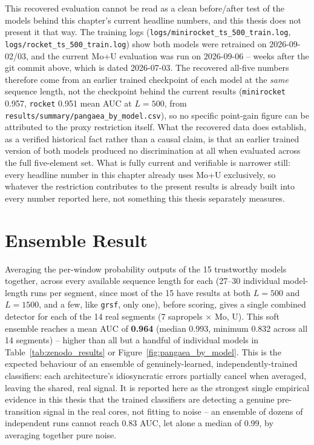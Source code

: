 This recovered evaluation cannot be read as a clean before/after test of the models behind this chapter's current headline numbers, and this thesis does not present it that way. The training logs (\texttt{logs/minirocket\_ts\_500\_train.log}, \texttt{logs/rocket\_ts\_500\_train.log}) show both models were retrained on 2026-09-02/03, and the current Mo+U evaluation was run on 2026-09-06 -- weeks after the git commit above, which is dated 2026-07-03. The recovered all-five numbers therefore come from an earlier trained checkpoint of each model at the \emph{same} sequence length, not the checkpoint behind the current results (\texttt{minirocket} 0.957, \texttt{rocket} 0.951 mean AUC at $L{=}500$, from \texttt{results/summary/pangaea\_by\_model.csv}), so no specific point-gain figure can be attributed to the proxy restriction itself. What the recovered data does establish, as a verified historical fact rather than a causal claim, is that an earlier trained version of both models produced no discrimination at all when evaluated across the full five-element set. What is fully current and verifiable is narrower still: every headline number in this chapter already uses Mo+U exclusively, so whatever the restriction contributes to the present results is already built into every number reported here, not something this thesis separately measures.

\section{Ensemble Result}
\label{sec:ensemble_result}
Averaging the per-window probability outputs of the 15 trustworthy models together, across every available sequence length for each (27--30 individual model-length runs per segment, since most of the 15 have results at both $L=500$ and $L=1500$, and a few, like \texttt{grsf}, only one), before scoring, gives a single combined detector for each of the 14 real segments (7 sapropels $\times$ Mo, U). This soft ensemble reaches a mean AUC of \textbf{0.964} (median 0.993, minimum 0.832 across all 14 segments) -- higher than all but a handful of individual models in Table~\ref{tab:zenodo_results} or Figure~\ref{fig:pangaea_by_model}. This is the expected behaviour of an ensemble of genuinely-learned, independently-trained classifiers: each architecture's idiosyncratic errors partially cancel when averaged, leaving the shared, real signal. It is reported here as the strongest single empirical evidence in this thesis that the trained classifiers are detecting a genuine pre-transition signal in the real cores, not fitting to noise -- an ensemble of dozens of independent runs cannot reach 0.83 AUC, let alone a median of 0.99, by averaging together pure noise.

